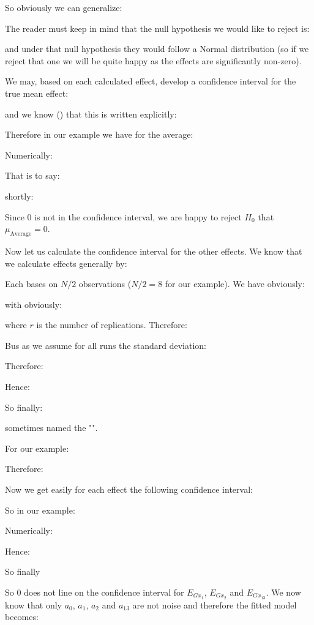 	So obviously we can generalize:
	
	The reader must keep in mind that the null hypothesis we would like to reject is:
	
	and under that null hypothesis they would follow a Normal distribution (so if we reject that one we will be quite happy as the effects are significantly non-zero).
	
	We may, based on each calculated effect, develop a confidence interval for the true mean effect:
	
	and we know () that this is written explicitly:
	
	Therefore in our example we have for the average:
	
	Numerically:
	
	That is to say:
	
	shortly:
	
	Since $0$ is not in the confidence interval, we are happy to reject $H_0$ that $\mu_\text{Average}=0$.
	
	Now let us calculate the confidence interval for the other effects. We know that we calculate effects generally by:
	
	Each bases on $N/2$ observations ($N/2=8$ for our example). We have obviously:
	
	with obviously:
	
	where $r$ is the number of replications. Therefore:
	
	Bus as we assume for all runs the standard deviation:
	
	Therefore:
	
	Hence:
	
	So finally:
	
	sometimes named the "\NewTerm{}".
	
	For our example:
	
	Therefore:
	
	Now we get easily for each effect the following confidence interval:
	
	So in our example:
	
	Numerically:
	
	Hence:
	
	So finally
	
	So $0$ does not line on the confidence interval for $E_{Gx_1}$, $E_{Gx_2}$ and $E_{Gx_{13}}$. We now know that only $a_0$, $a_1$, $a_2$ and $a_{13}$ are not noise and therefore the fitted model becomes:
	
